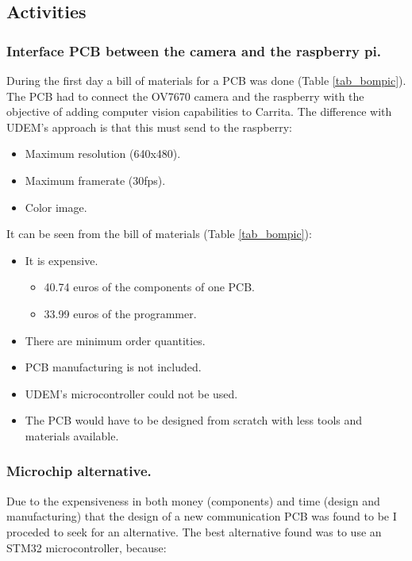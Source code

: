 \subsection{Activities}

\subsubsection{Interface PCB between the camera and the raspberry pi.}
During the first day a bill of materials for a PCB was done (Table \ref{tab_bompic}). The PCB had to connect the OV7670 camera and the raspberry with the objective of adding computer vision capabilities to Carrita. The difference with UDEM's approach is that this must send to the raspberry:
\begin{itemize}
	\item Maximum resolution (640x480).
	\item Maximum framerate (30fps).
	\item Color image.
\end{itemize}

It can be seen from the bill of materials (Table \ref{tab_bompic}):
\begin{itemize}
	\item It is expensive.
	\begin{itemize}
		\item 40.74 euros of the components of one PCB.
		\item 33.99 euros of the programmer.
	\end{itemize}
	\item There are minimum order quantities.
	\item PCB manufacturing is not included.
	\item UDEM's microcontroller could not be used.
	\item The PCB would have to be designed from scratch with less tools and materials available.
\end{itemize}


\subsubsection{Microchip alternative.}
Due to the expensiveness in both money (components) and time (design and manufacturing) that the design of a new communication PCB was found to be I proceded to seek for an alternative. The best alternative found was to use an STM32 microcontroller, because:

